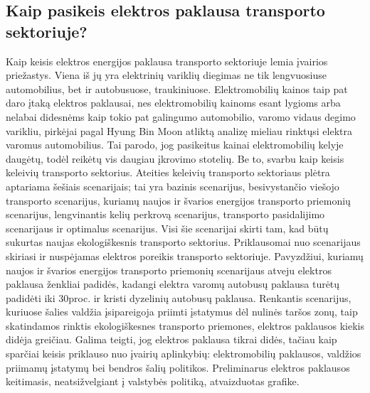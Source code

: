 \documentclass[12pt, titlepage]{article}
\begin{document}
\subsection{Kaip pasikeis elektros paklausa transporto sektoriuje?}
Kaip keisis elektros energijos paklausa transporto sektoriuje lemia įvairios priežastys. Viena iš jų yra elektrinių variklių diegimas ne tik lengvuosiuse automobilius, bet ir autobusuose, traukiniuose. Elektromobilių kainos taip pat daro įtaką elektros paklausai, nes elektromobilių kainoms esant lygioms arba nelabai didesnėms kaip tokio pat galingumo automobilio, varomo vidaus degimo varikliu, pirkėjai pagal Hyung Bin Moon atliktą analizę mieliau rinktųsi elektra varomus automobilius. Tai parodo, jog pasikeitus kainai elektromobilių kelyje daugėtų, todėl reikėtų vis daugiau įkrovimo stotelių. 
Be to, svarbu kaip keisis keleivių transporto sektorius.
Ateities keleivių transporto sektoriaus plėtra aptariama šešiais scenarijais; tai yra bazinis scenarijus, besivystančio viešojo transporto scenarijus, kuriamų naujos ir švarios energijos transporto priemonių scenarijus, lengvinantis kelių perkrovą scenarijus, transporto pasidalijimo scenarijaus ir optimalus scenarijus.\parencite{fan2017energy}
Visi šie scenarijai skirti tam, kad būtų sukurtas naujas ekologiškesnis transporto sektorius. Priklausomai nuo scenarijaus skiriasi ir nuspėjamas elektros poreikis transporto sektoriuje. Pavyzdžiui, kuriamų naujos ir švarios energijos transporto priemonių scenarijaus atveju elektros paklausa ženkliai padidės, kadangi elektra varomų autobusų paklausa turėtų padidėti iki 30proc. ir kristi dyzelinių autobusų paklausa. Renkantis scenarijus, kuriuose šalies valdžia įsipareigoja priimti įstatymus dėl nulinės taršos zonų, taip skatindamos rinktis ekologiškesnes transporto priemones, elektros paklausos kiekis didėja greičiau. Galima teigti, jog elektros paklausa tikrai didės, tačiau kaip sparčiai keisis priklauso nuo įvairių aplinkybių: elektromobilių paklausos, valdžios priimamų įstatymų bei bendros šalių politikos. Preliminarus elektros paklausos keitimasis, neatsižvelgiant į valstybės politiką, atvaizduotas grafike. 
\end{document}
